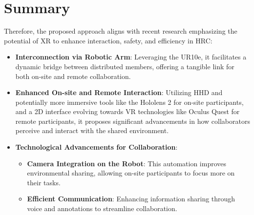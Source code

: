 \section{Summary}
Therefore, the proposed approach aligns with recent research emphasizing the potential of \ac{XR} to enhance interaction, safety, and efficiency 
in \ac{HRC}:
\begin{itemize}
    \item \textbf{Interconnection via Robotic Arm}: Leveraging the UR10e, it facilitates a dynamic bridge between distributed members, offering a 
    tangible link for both on-site and remote collaboration.

    \item \textbf{Enhanced On-site and Remote Interaction}: Utilizing \ac{HHD} and potentially more immersive tools like the Hololens 2 for on-site 
    participants, and a 2D interface evolving towards \ac{VR} technologies like Oculus Quest for remote participants, it proposes significant advancements 
    in how collaborators perceive and interact with the shared environment.

    \item \textbf{Technological Advancements for Collaboration}:
    \begin{itemize}
        \item \textbf{Camera Integration on the Robot}: This automation improves environmental sharing, allowing on-site participants to focus more 
        on their tasks. 
        \item \textbf{Efficient Communication}: Enhancing information sharing through voice and annotations to streamline collaboration.
    \end{itemize}
\end{itemize}









